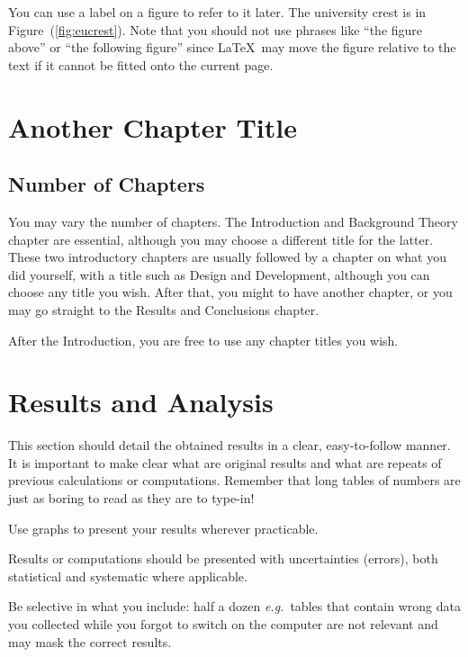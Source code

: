 \documentclass[12pt,a4paper]{report}
\begin{document}

You can use a label on a figure to refer to it later. The university
crest is in Figure~(\ref{fig:eucrest}). Note that you should not use
phrases like ``the figure above'' or ``the following figure'' since
\LaTeX\ may move the figure relative to the text if it cannot be fitted
onto the current page.

\chapter{Another Chapter Title}
\section{Number of Chapters}

You may vary the number of chapters. The Introduction and Background
Theory chapter are essential, although you may choose a different
title for the latter. These two introductory chapters are usually
followed by a chapter on what you did yourself, with a title such as
Design and Development, although you can choose any title you
wish. After that, you might to have another chapter, or you may go
straight to the Results and Conclusions chapter.

After the Introduction, you are free to use any chapter titles you wish.


\chapter{Results and Analysis}

This section should detail the obtained results in a clear,
easy-to-follow manner. It is important to make clear what are original
results and what are repeats of previous calculations or computations.
Remember that long tables of numbers are just as boring to read as
they are to type-in!

Use graphs to present your results wherever practicable.

Results or computations should be presented with uncertainties
(errors), both statistical and systematic where applicable.

Be selective in what you include: half a dozen \emph{e.g.}~tables that
contain wrong data you collected while you forgot to switch on the
computer are not relevant and may mask the correct results.
\end{document}

